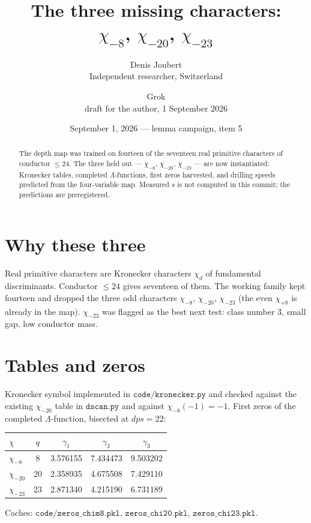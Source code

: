 \documentclass[10pt]{article}
\title{\bfseries The three missing characters:\\
$\chi_{-8}$, $\chi_{-20}$, $\chi_{-23}$}
\author{Denis Joubert\\ \small Independent researcher, Switzerland
\and Grok\\ \small draft for the author, 1 September 2026}
\date{September 1, 2026 --- lemma campaign, item 5}
\begin{document}
\maketitle
\begin{abstract}
\noindent
The depth map was trained on fourteen of the seventeen real primitive
characters of conductor $\le24$. The three held out --- $\chi_{-8}$,
$\chi_{-20}$, $\chi_{-23}$ --- are now instantiated: Kronecker tables,
completed $\Lambda$-functions, first zeros harvested, and drilling
speeds predicted from the four-variable map. Measured $s$ is not
computed in this commit; the predictions are preregistered.
\end{abstract}

\section{Why these three}

Real primitive characters are Kronecker characters $\chi_d$ of
fundamental discriminants. Conductor $\le24$ gives seventeen of them.
The working family kept fourteen and dropped the three odd characters
$\chi_{-8}$, $\chi_{-20}$, $\chi_{-23}$ (the even $\chi_{+8}$ is
already in the map). $\chi_{-23}$ was flagged as the best next test:
class number $3$, small gap, low conductor mass.

\section{Tables and zeros}

Kronecker symbol implemented in $\mathtt{code/kronecker.py}$ and
checked against the existing $\chi_{-20}$ table in
$\mathtt{dscan.py}$ and against $\chi_{-8}(-1)=-1$. First zeros of the
completed $\Lambda$-function, bisected at $dps=22$:
\begin{center}\small
\begin{tabular}{lcccc}
\toprule
$\chi$ & $q$ & $\gamma_1$ & $\gamma_2$ & $\gamma_3$ \\
\midrule
$\chi_{-8}$  & 8  & 3.576155 & 7.434473 & 9.503202 \\
$\chi_{-20}$ & 20 & 2.358935 & 4.675508 & 7.429110 \\
$\chi_{-23}$ & 23 & 2.871340 & 4.215190 & 6.731189 \\
\bottomrule
\end{tabular}
\end{center}
Caches: $\mathtt{code/zeros\_chim8.pkl}$,
$\mathtt{zeros\_chi20.pkl}$, $\mathtt{zeros\_chi23.pkl}$.
\end{document}
